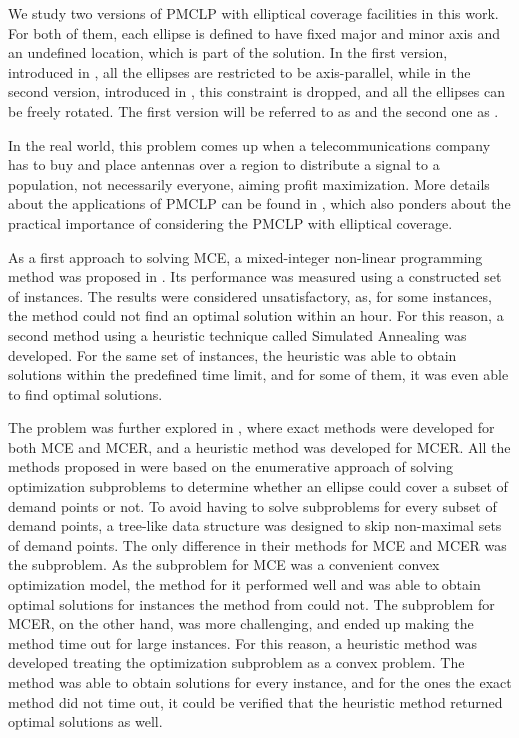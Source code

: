 We study two versions of PMCLP with elliptical coverage facilities in this work. For both of them, each ellipse is defined to have {\color{Red}fixed major and minor axis} and an undefined location, which is part of the solution.
In the first version, introduced in \cite{canbolat}, all the ellipses are restricted to be axis-parallel, while in the second version, introduced in \cite{andreta}, this constraint is dropped, and all the ellipses can be freely rotated.
The first version will be referred to as  and the second one as  .

{\color{Green}
	In the real world, this problem comes up when a telecommunications company has to buy and place antennas over a region to distribute a signal to a population, not necessarily everyone, aiming profit maximization. 
	More details about the applications of PMCLP can be found in \cite{canbolat}, which also ponders about the practical importance of considering the PMCLP with elliptical coverage.
	
	As a first approach to solving MCE, a mixed-integer non-linear programming method was proposed in \cite{canbolat}. 
	Its performance was measured using a constructed set of instances. The results were considered unsatisfactory, as, for some instances, the method could not find an optimal solution within an hour. 
	For this reason, a second method using a heuristic technique called Simulated Annealing was developed. For the same set of instances, the heuristic was able to obtain solutions within the predefined time limit, and for some of them, it was even able to find optimal solutions.
}

The problem was further explored in , where exact methods were developed for both MCE and MCER, and a heuristic method was developed for MCER.
All the methods proposed in \cite{andreta} were based on the enumerative approach of solving optimization subproblems to determine whether an ellipse could cover a subset of demand points or not. To avoid having to solve subproblems for every subset of demand points, a tree-like data structure was designed to skip non-maximal sets of demand points.
The only difference in their methods for MCE and MCER was the subproblem.
As the subproblem for MCE was a convenient convex optimization model, the method for it performed well and  was able to obtain optimal solutions for instances the method from \cite{canbolat} could not.
The subproblem for MCER, on the other hand, was more challenging, and ended up making the method time out for large instances. For this reason, a heuristic method was developed treating the optimization subproblem as a convex problem. The method was able to obtain solutions for every instance, and for the ones the exact method did not time out, it could be verified that the heuristic method returned optimal {\color{blue}solutions} as well.

